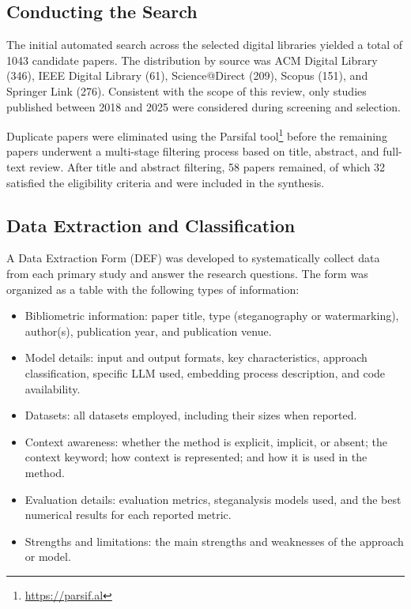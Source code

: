 \subsection{Conducting the Search}
The initial automated search across the selected digital libraries yielded a total of 1043 candidate papers. The distribution by source was ACM Digital Library (346), IEEE Digital Library (61), Science@Direct (209), Scopus (151), and Springer Link (276). Consistent with the scope of this review, only studies published between 2018 and 2025 were considered during screening and selection.

Duplicate papers were eliminated using the Parsifal tool\footnote{\href{https://parsif.al}{https://parsif.al}} before the remaining papers underwent a multi-stage filtering process based on title, abstract, and full-text review. After title and abstract filtering, 58 papers remained, of which 32 satisfied the eligibility criteria and were included in the synthesis.

\subsection{Data Extraction and Classification}
A Data Extraction Form (DEF) was developed to systematically collect data from each primary study and answer the research questions. The form was organized as a table with the following types of information:

\begin{itemize}
	\item Bibliometric information: paper title, type (steganography or watermarking), author(s), publication year, and publication venue.
	\item Model details: input and output formats, key characteristics, approach classification, specific LLM used, embedding process description, and code availability.
	\item Datasets: all datasets employed, including their sizes when reported.
	\item Context awareness: whether the method is explicit, implicit, or absent; the context keyword; how context is represented; and how it is used in the method.
	\item Evaluation details: evaluation metrics, steganalysis models used, and the best numerical results for each reported metric.
	\item Strengths and limitations: the main strengths and weaknesses of the approach or model.
\end{itemize}

